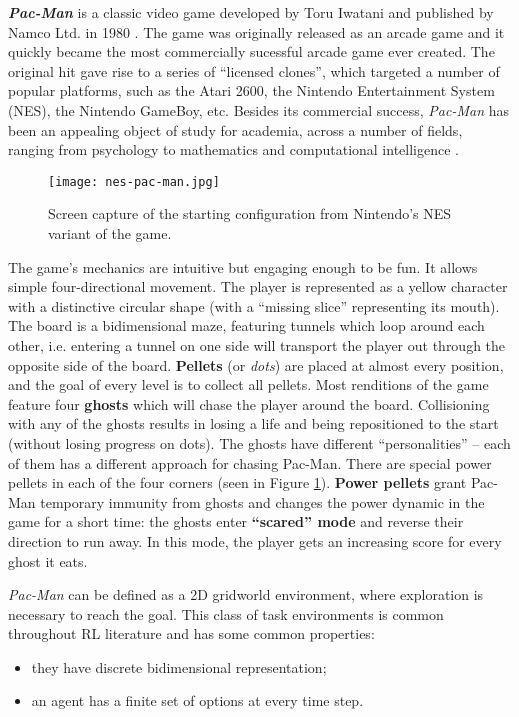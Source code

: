 \textbf{\textit{Pac-Man}} is a classic video game developed by Toru Iwatani and published by Namco Ltd. in 1980 \cite{pacman-in-academia}.
The game was originally released as an arcade game and it quickly became the most commercially sucessful arcade game ever created.
The original hit gave rise to a series of ``licensed clones'', which targeted a number of popular platforms, such as the Atari 2600, the Nintendo Entertainment System (NES), the Nintendo GameBoy, etc.
Besides its commercial success, \emph{Pac-Man} has been an appealing object of study for academia, across a number of fields, ranging from psychology to mathematics and computational intelligence \cite{pacman-in-academia}.

\begin{figure}[h]
    \centering
    \texttt{[image: nes-pac-man.jpg]}
    \caption{Screen capture of the starting configuration from Nintendo's NES variant of the game.}
    \label{fig:pac-man-screen}
\end{figure}

The game's mechanics are intuitive but engaging enough to be fun.
It allows simple four-directional movement.
The player is represented as a yellow character with a distinctive circular shape (with a ``missing slice''\footnotemark{} representing its mouth).
The board is a bidimensional maze, featuring tunnels which loop around each other, i.e. entering a tunnel on one side will transport the player out through the opposite side of the board.
\textbf{Pellets} (or \emph{dots}) are placed at almost every position, and the goal of every level is to collect all pellets.
Most renditions of the game feature four \textbf{ghosts} which will chase the player around the board.
Collisioning with any of the ghosts results in losing a life and being repositioned to the start (without losing progress on dots).
The ghosts have different ``personalities'' -- each of them has a different approach for chasing Pac-Man.
There are special power pellets in each of the four corners (seen in Figure \ref{fig:pac-man-screen}).
\textbf{Power pellets} grant Pac-Man temporary immunity from ghosts and changes the power dynamic in the game for a short time: the ghosts enter \textbf{``scared'' mode} and reverse their direction to run away.
In this mode, the player gets an increasing score for every ghost it eats.

\emph{Pac-Man} can be defined as a 2D gridworld environment, where exploration is necessary to reach the goal.
This class of task environments is common throughout RL literature and has some common properties:
\begin{itemize}
    \item they have discrete bidimensional representation;
    \item an agent has a finite set of options at every time step.
\end{itemize}

